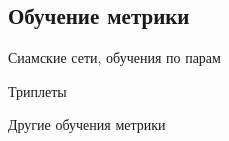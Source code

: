 \subsection{Обучение метрики}

\begin{frame}{Сиамские сети, обучения по парам}
    
\end{frame}

\begin{frame}{Триплеты}
    
\end{frame}

\begin{frame}{Другие обучения метрики}
    
\end{frame}
